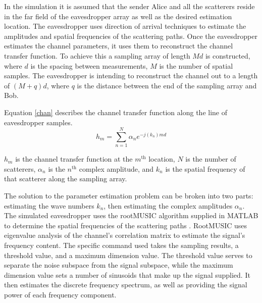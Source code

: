 \documentclass{allertonproc}
\begin{document}
In the simulation it is assumed that the sender Alice and all the scatterers reside in the far field of the eavesdropper array as well as the desired estimation location. The eavesdropper uses direction of arrival techniques to estimate the amplitudes and spatial frequencies of the scattering paths. Once the eavesdropper estimates the channel parameters, it uses them to reconstruct the channel transfer function. To achieve this a sampling array of length $Md$ is constructed, where $d$ is the spacing between measurements, $M$ is the number of spatial samples. The eavesdropper is intending to reconstruct the channel out to a length of $(M+q)d$, where $q$ is the distance between the end of the sampling array and Bob. 

Equation \ref{chan} describes the channel transfer function along the line of eavesdropper samples.
\begin{equation}\label{chan}
h_m= \sum_{n=1}^N \alpha_n e^{-j(k_n)md}
\end{equation}

 $h_m$ is the channel transfer function at the $m^{\mathrm{th}}$ location, $N$ is the number of scatterers, $\alpha_n$ is the $n^{\mathrm{th}}$ complex amplitude, and $k_n$ is the spatial frequency of that scatterer along the sampling array.  

The solution to the parameter estimation problem can be broken into two parts: estimating the wave numbers $k_n$, then estimating the complex amplitudes $\alpha_n$. The simulated eavesdropper uses the rootMUSIC algorithm supplied in MATLAB to determine the spatial frequencies of the scattering paths \cite{matlab}. RootMUSIC uses eigenvalue analysis of the channel's correlation matrix to estimate the signal's frequency content. The specific command used takes the sampling results, a threshold value, and a maximum dimension value. The threshold value serves to separate the noise subspace from the signal subspace, while the maximum dimension value sets a number of sinusoids that make up the signal supplied. It then estimates the discrete frequency spectrum, as well as providing the signal power of each frequency component. 
\end{document}
